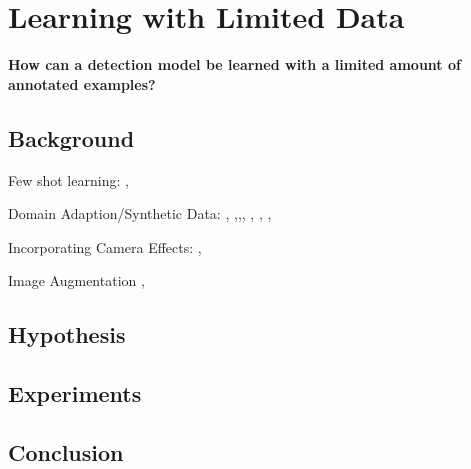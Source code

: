 \chapter{Learning with Limited Data}
\label{sec:training}

\begin{center}
	\textbf{How can a detection model be learned with a limited amount of annotated examples?}
\end{center}



\section{Background}
Few shot learning:
   \cite{Moysset2016}, \cite{Chen2018a}

Domain Adaption/Synthetic Data:
 \cite{Chen2018c}, \cite{Xu2017}
\cite{Tremblay2018a} ,\cite{Inoue},\cite{Peng},
\cite{Rozantsev},  \cite{Le}, \cite{Liu2017}, \cite{Peng2017}

Incorporating Camera Effects:
\cite{Carlson2018},\cite{Vass}

Image Augmentation
 \cite{Bai2017},
 
\section{Hypothesis}

 
\section{Experiments}


\section{Conclusion}




